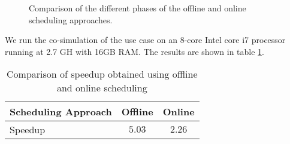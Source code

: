 \begin{figure}[phbt]
\centering

\caption{Comparison of the different phases of the offline and online scheduling approaches.}
\label{fig:tbbvsrcosim}
\end{figure}

We run the co-simulation of the use case on an 8-core Intel core i7 processor running at 2.7 GH with 16GB RAM. The results are shown in table \ref{table:spdup_compr}.

\begin{table}[phbt]
\caption{Comparison of speedup obtained using offline and online scheduling}
\centering
\label{table:spdup_compr}
\begin{tabular}{l c c}
\toprule
\parbox[l]{5cm}{\raggedright Scheduling Approach} & Offline & Online \\
\midrule
Speedup & $5.03$ & $2.26$\\
\bottomrule
\end{tabular}
\end{table}


